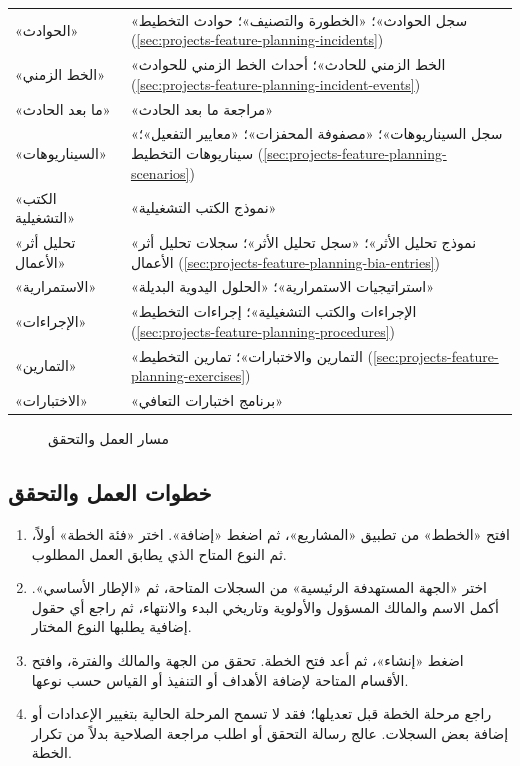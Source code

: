 \begin{table}[H]
\begin{tabularx}{\linewidth}{R{4.2cm} Y}
«الحوادث» & «سجل الحوادث»؛ «الخطورة والتصنيف»؛ حوادث التخطيط (\ref{sec:projects-feature-planning-incidents})\\
«الخط الزمني» & «الخط الزمني للحادث»؛ أحداث الخط الزمني للحوادث (\ref{sec:projects-feature-planning-incident-events})\\
«ما بعد الحادث» & «مراجعة ما بعد الحادث»\\
«السيناريوهات» & «سجل السيناريوهات»؛ «مصفوفة المحفزات»؛ «معايير التفعيل»؛ سيناريوهات التخطيط (\ref{sec:projects-feature-planning-scenarios})\\
«الكتب التشغيلية» & «نموذج الكتب التشغيلية»\\
«تحليل أثر الأعمال» & «نموذج تحليل الأثر»؛ «سجل تحليل الأثر»؛ سجلات تحليل أثر الأعمال (\ref{sec:projects-feature-planning-bia-entries})\\
«الاستمرارية» & «استراتيجيات الاستمرارية»؛ «الحلول اليدوية البديلة»\\
«الإجراءات» & «الإجراءات والكتب التشغيلية»؛ إجراءات التخطيط (\ref{sec:projects-feature-planning-procedures})\\
«التمارين» & «التمارين والاختبارات»؛ تمارين التخطيط (\ref{sec:projects-feature-planning-exercises})\\
«الاختبارات» & «برنامج اختبارات التعافي»\\
\end{tabularx}
\end{table}
\begin{figure}[H]
\centering
{}
\rclegend
\caption{مسار العمل والتحقق}
\label{fig:projects-plans-flow}
\end{figure}

\subsection{خطوات العمل والتحقق}
\begin{enumerate}
\item افتح «الخطط» من تطبيق «المشاريع»، ثم اضغط «إضافة». اختر «فئة الخطة» أولاً، ثم النوع المتاح الذي يطابق العمل المطلوب.
\item اختر «الجهة المستهدفة الرئيسية» من السجلات المتاحة، ثم «الإطار الأساسي». أكمل الاسم والمالك المسؤول والأولوية وتاريخي البدء والانتهاء، ثم راجع أي حقول إضافية يطلبها النوع المختار.
\item اضغط «إنشاء»، ثم أعد فتح الخطة. تحقق من الجهة والمالك والفترة، وافتح الأقسام المتاحة لإضافة الأهداف أو التنفيذ أو القياس حسب نوعها.
\item راجع مرحلة الخطة قبل تعديلها؛ فقد لا تسمح المرحلة الحالية بتغيير الإعدادات أو إضافة بعض السجلات. عالج رسالة التحقق أو اطلب مراجعة الصلاحية بدلاً من تكرار الخطة.
\end{enumerate}

